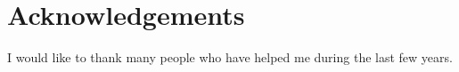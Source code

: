 
\chapter*{Acknowledgements}
\thispagestyle{empty}

I would like to thank many people who have helped me during the last few years.
